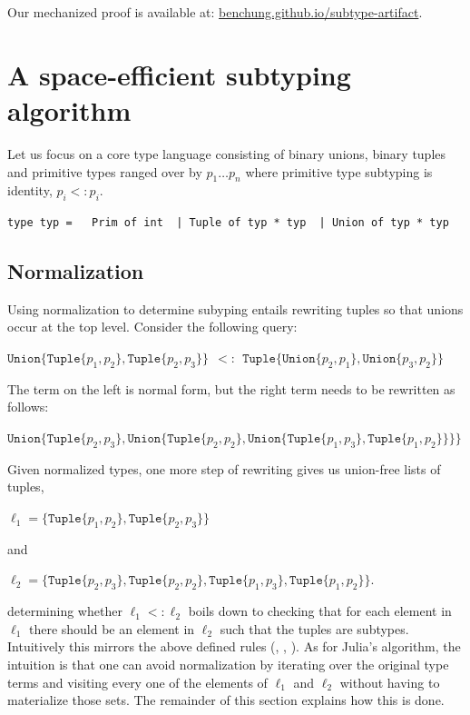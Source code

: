 \documentclass[a4paper,english]{lipics-v2019}
\newcommand{\xt}[1]{\texttt{#1}}
\newcommand{\union}[2]{\xt{Union\{}#1,#2\xt{\}}}
\newcommand{\tuple}[1]{\xt{Tuple\{}#1\xt{\}}}
\begin{document}
\medskip
Our mechanized proof is available at: {\small\url{benchung.github.io/subtype-artifact}}.

\section{A space-efficient subtyping algorithm}

Let us focus on a core type language consisting of binary unions, binary
tuples and primitive types ranged over by $p_1 \dots p_n$ where primitive
type subtyping is identity, $p_i <: p_i$.

\medskip
\begin{lstlisting}
type typ =   Prim of int  | Tuple of typ * typ  | Union of typ * typ
\end{lstlisting}
\medskip

\subsection{Normalization}\label{normalize}

Using normalization to determine subyping entails rewriting tuples so that
unions occur at the top level. Consider the following query:

\medskip
$\union{ \tuple{p_1,p_2}}{\tuple{p_2,p_3}} ~~ <:~~  \tuple{ \union{p_2}{p_1}, \union{p_3}{p_2}}$
\medskip

\noindent
The term on the left is normal form, but the right term  needs to be
rewritten as follows:

\medskip
$\union{ \tuple{p_2,p_3}}
  {\union{ \tuple{p_2,p_2}}
    {\union{ \tuple{p_1,p_3}}
           {\tuple{p_1,p_2}}}}$
\medskip

\noindent
Given normalized types, one more step of rewriting gives us union-free
lists of tuples,

\medskip
$\ell_1 = \{  \tuple{p_1,p_2}, \tuple{p_2,p_3}  \}$
\medskip

\noindent and

\medskip
$\ell_2 = \{  \tuple{p_2,p_3}, \tuple{p_2,p_2}, \tuple{p_1,p_3}, 
          \tuple{p_1,p_2} \}$.
\medskip

\noindent determining whether $\ell_1 <: \ell_2$ boils down to checking that
for each element in $\ell_1$ there should be an element in $\ell_2$ such
that the tuples are subtypes. Intuitively this mirrors the above defined
rules ({\sc [allexist]}, {\sc [existL/R]}, {\sc [tuple]}). As for Julia's
algorithm, the intuition is that one can avoid normalization by iterating
over the original type terms and visiting every one of the elements of
$\ell_1$ and $\ell_2$ without having to materialize those sets. The
remainder of this section explains how this is done.
\end{document}
